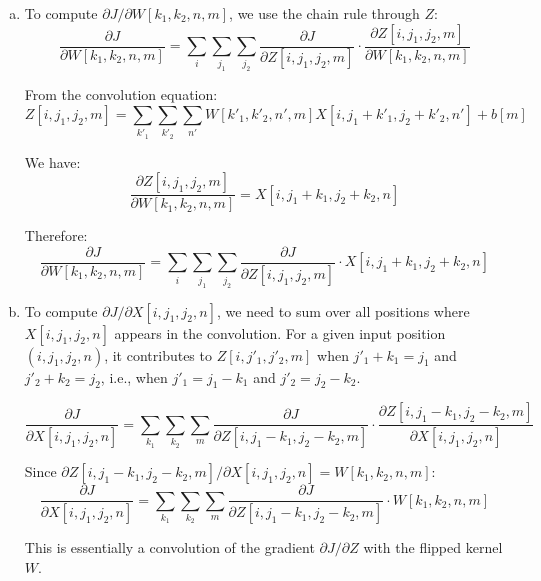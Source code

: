 \documentclass[11pt]{article}
\begin{document}
\begin{enumerate}
\begin{solution}
\begin{enumerate}[(a)]
Therefore:
\[
\frac{\partial J}{\partial Z[i,j_1,j_2,m]} = \frac{\partial J}{\partial U[i,j_1,j_2,m]} \cdot U[i,j_1,j_2,m](1-U[i,j_1,j_2,m])
\]

\item To compute $\partial J/\partial W[k_1,k_2,n,m]$, we use the chain rule through $Z$:
\[
\frac{\partial J}{\partial W[k_1,k_2,n,m]} = \sum_i \sum_{j_1} \sum_{j_2} \frac{\partial J}{\partial Z[i,j_1,j_2,m]} \cdot \frac{\partial Z[i,j_1,j_2,m]}{\partial W[k_1,k_2,n,m]}
\]

From the convolution equation:
\[
Z[i,j_1,j_2,m] = \sum_{k'_1} \sum_{k'_2} \sum_{n'} W[k'_1,k'_2,n',m] X[i,j_1+k'_1,j_2+k'_2,n'] + b[m]
\]

We have:
\[
\frac{\partial Z[i,j_1,j_2,m]}{\partial W[k_1,k_2,n,m]} = X[i,j_1+k_1,j_2+k_2,n]
\]

Therefore:
\[
\frac{\partial J}{\partial W[k_1,k_2,n,m]} = \sum_i \sum_{j_1} \sum_{j_2} \frac{\partial J}{\partial Z[i,j_1,j_2,m]} \cdot X[i,j_1+k_1,j_2+k_2,n]
\]

\item To compute $\partial J/\partial X[i,j_1,j_2,n]$, we need to sum over all positions where $X[i,j_1,j_2,n]$ appears in the convolution. For a given input position $(i,j_1,j_2,n)$, it contributes to $Z[i,j'_1,j'_2,m]$ when $j'_1 + k_1 = j_1$ and $j'_2 + k_2 = j_2$, i.e., when $j'_1 = j_1 - k_1$ and $j'_2 = j_2 - k_2$.

\[
\frac{\partial J}{\partial X[i,j_1,j_2,n]} = \sum_{k_1} \sum_{k_2} \sum_m \frac{\partial J}{\partial Z[i,j_1-k_1,j_2-k_2,m]} \cdot \frac{\partial Z[i,j_1-k_1,j_2-k_2,m]}{\partial X[i,j_1,j_2,n]}
\]

Since $\partial Z[i,j_1-k_1,j_2-k_2,m]/\partial X[i,j_1,j_2,n] = W[k_1,k_2,n,m]$:
\[
\frac{\partial J}{\partial X[i,j_1,j_2,n]} = \sum_{k_1} \sum_{k_2} \sum_m \frac{\partial J}{\partial Z[i,j_1-k_1,j_2-k_2,m]} \cdot W[k_1,k_2,n,m]
\]

This is essentially a convolution of the gradient $\partial J/\partial Z$ with the flipped kernel $W$.
\end{enumerate}
\end{solution}


\end{enumerate}
\end{document}
